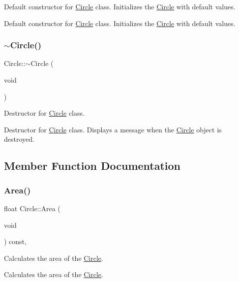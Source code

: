 Default constructor for \mbox{\hyperlink{class_circle}{Circle}} class. Initializes the \mbox{\hyperlink{class_circle}{Circle}} with default values. 

Default constructor for \mbox{\hyperlink{class_circle}{Circle}} class. Initializes the \mbox{\hyperlink{class_circle}{Circle}} with default values.\mbox{\label{class_circle_a22d1064e650bcb96834a3056277a4185}} 
\subsubsection{\texorpdfstring{$\sim$Circle()}{~Circle()}}
{\footnotesize\ttfamily Circle\+::$\sim$\+Circle (\begin{DoxyParamCaption}\item[{void}]{ }\end{DoxyParamCaption})}



Destructor for \mbox{\hyperlink{class_circle}{Circle}} class. 

Destructor for \mbox{\hyperlink{class_circle}{Circle}} class. Displays a message when the \mbox{\hyperlink{class_circle}{Circle}} object is destroyed.

\subsection{Member Function Documentation}
\mbox{\label{class_circle_ae720283333ec4b0336f3ad6ff8bf20ce}} 
\subsubsection{\texorpdfstring{Area()}{Area()}}
{\footnotesize\ttfamily float Circle\+::\+Area (\begin{DoxyParamCaption}\item[{void}]{ }\end{DoxyParamCaption}) const\hspace{0.3cm}{\ttfamily [override]}, {\ttfamily [virtual]}}



Calculates the area of the \mbox{\hyperlink{class_circle}{Circle}}. 

Calculates the area of the \mbox{\hyperlink{class_circle}{Circle}}.

